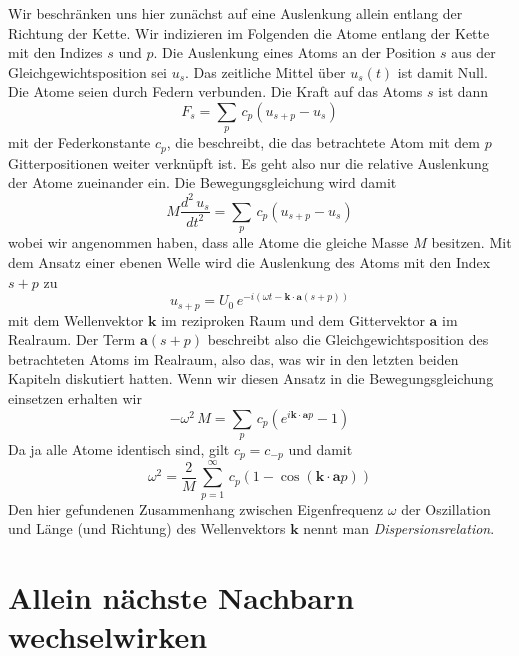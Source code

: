 Wir beschränken uns hier zunächst auf eine Auslenkung allein entlang der Richtung der Kette. Wir indizieren im Folgenden die Atome entlang der Kette mit den Indizes $s$ und $p$. Die Auslenkung eines Atoms an der Position $s$ aus der Gleichgewichtsposition sei $u_s$. 
Das zeitliche Mittel über $u_s(t)$ ist damit Null. Die Atome seien durch Federn verbunden. Die Kraft auf das Atoms $s$ ist dann
\begin{equation}
F_s = \sum_p \, c_p \left( u_{s+p} - u_s \right)
\end{equation}
mit der Federkonstante $c_p$, die beschreibt, die das betrachtete Atom mit dem $p$ Gitterpositionen weiter verknüpft ist. Es geht also nur die relative Auslenkung der Atome zueinander ein. Die Bewegungsgleichung wird damit
\begin{equation}
M \frac{d^2 \, u_s}{dt^2} = \sum_p \, c_p \left( u_{s+p} - u_s \right)
\end{equation}
wobei wir angenommen haben, dass alle Atome die gleiche Masse $M$ besitzen. Mit dem Ansatz einer ebenen Welle wird die Auslenkung des Atoms mit den Index $s+p$ zu
\begin{equation}
u_{s+p} = U_0 \, e^{-i ( \omega t - \mathbf{k} \cdot \mathbf{a} (s+p) )}
\end{equation}
mit dem Wellenvektor $\mathbf{k}$ im reziproken Raum und dem Gittervektor $\mathbf{a}$ im Realraum. Der Term $\mathbf{a} (s+p)$ beschreibt also die  Gleichgewichtsposition des betrachteten Atoms im Realraum, also das, was wir in den letzten beiden Kapiteln diskutiert hatten. Wenn wir diesen Ansatz in die Bewegungsgleichung einsetzen erhalten wir
\begin{equation}
- \omega^2 \, M = \sum_p \, c_p \left( e^{i \mathbf{k} \cdot \mathbf{a} p} - 1 \right)
\end{equation}
Da ja alle Atome identisch sind, gilt $c_p = c_{-p}$ und damit
\begin{equation}
 \omega^2 =  \frac{2}{M} \, \sum_{p=1}^\infty \, c_p \left( 1 - \cos ( \mathbf{k} \cdot \mathbf{a} p ) \right)
\end{equation}
Den hier gefundenen Zusammenhang zwischen Eigenfrequenz $\omega$ der Oszillation und Länge (und Richtung) des Wellenvektors $\mathbf{k}$ nennt man \emph{Dispersionsrelation}.





\section{Allein nächste Nachbarn wechselwirken}

